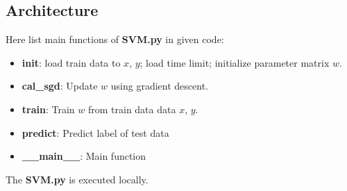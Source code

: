\documentclass[conference,compsoc]{IEEEtran}
\begin{document}
\subsection{Architecture}
Here list main functions of \textbf{SVM.py} in given code:
\begin{itemize}
    \item \textbf{init}: load train data to $x$, $y$; load time limit; initialize
	    parameter matrix $w$.
    \item \textbf{cal\_sgd}: Update $w$ using gradient descent.
    \item \textbf{train}: Train $w$ from train data data $x$, $y$.
    \item \textbf{predict}: Predict label of test data
    \item \textbf{\_\_main\_\_}: Main function
\end{itemize}

The \textbf{SVM.py} is executed locally.
\end{document}
